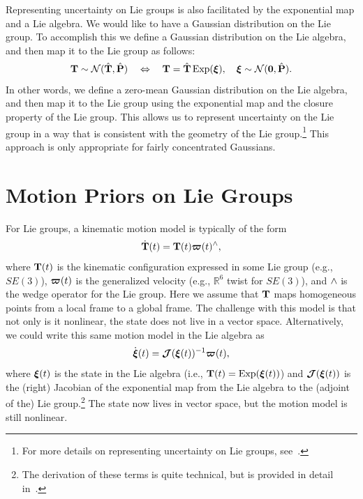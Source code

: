 Representing uncertainty on Lie groups is also facilitated by the exponential map and a Lie algebra.  We would like to have a Gaussian distribution on the Lie group.  To accomplish this we define a Gaussian distribution on the Lie algebra, and then map it to the Lie group as follows:           
\begin{equation}
\mathbf{T} \sim \mathcal{N}(\hat{\mathbf{T}}, \hat{\mathbf{P}}) \quad \Leftrightarrow \quad \mathbf{T} = \hat{\mathbf{T}} \, \mbox{Exp}({\boldsymbol{\xi}}), \quad {\boldsymbol{\xi}} \sim \mathcal{N}(\mathbf{0}, \hat{\mathbf{P}}).
\end{equation}
In other words, we define a zero-mean Gaussian distribution on the Lie algebra, and then map it to the Lie group using the exponential map and the closure property of the Lie group.  This allows us to represent uncertainty on the Lie group in a way that is consistent with the geometry of the Lie group.\footnote{For more details on representing uncertainty on Lie groups, see~\cite{barfoot_tro14}.}  This approach is only appropriate for fairly concentrated Gaussians.

\section{Motion Priors on Lie Groups}

For Lie groups, a kinematic motion model is typically of the form
\begin{equation}
\dot{\mathbf{T}}(t) = \mathbf{T}(t) {\boldsymbol{\varpi}}(t)^\wedge,
\end{equation}
where $\mathbf{T}(t)$ is the kinematic configuration expressed in some Lie group (e.g., $SE(3)$), ${\boldsymbol{\varpi}}(t)$ is the generalized velocity (e.g., $\mathbb{R}^6$ twist for $SE(3)$), and $\wedge$ is the wedge operator for the Lie group. Here we assume that $\mathbf{T}$ maps homogeneous points from a local frame to a global frame. The challenge with this model is that not only is it nonlinear, the state does not live in a vector space.  Alternatively, we could write this same motion model in the Lie algebra as
\begin{equation}
\dot{{\boldsymbol{\xi}}}(t) = {\boldsymbol{\mathcal{J}}}({\boldsymbol{\xi}}(t))^{-1} {\boldsymbol{\varpi}}(t),
\end{equation}
where ${\boldsymbol{\xi}}(t)$ is the state in the Lie algebra (i.e., $\mathbf{T}(t) = \mbox{Exp}({\boldsymbol{\xi}}(t))$) and ${\boldsymbol{\mathcal{J}}}({\boldsymbol{\xi}}(t))$ is the (right) Jacobian of the exponential map from the Lie algebra to the (adjoint of the) Lie group.\footnote{The derivation of these terms is quite technical, but is provided in detail in~\cite{barfoot_ser24}.}  The state now lives in vector space, but the motion model is still nonlinear.

